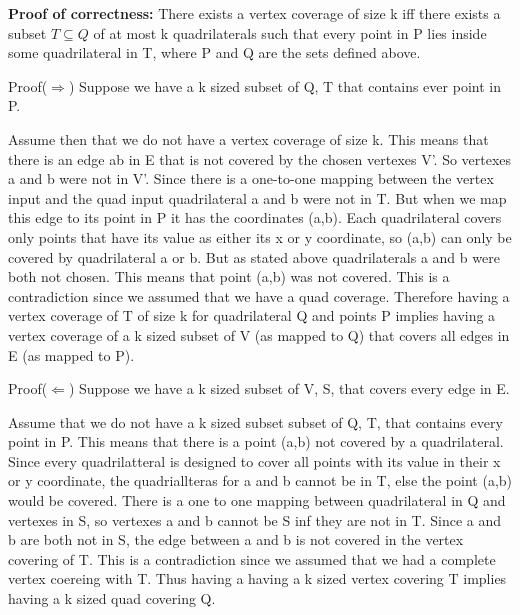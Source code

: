 \documentclass[12pt]{article}
\begin{document}
\textbf{Proof of correctness: } There exists a vertex coverage of size k iff there exists a subset $T \subseteq Q$ of at most k quadrilaterals such that every point in P lies inside some quadrilateral in T, where P and Q are the sets defined above.

Proof($\Rightarrow$)
Suppose we have a k sized subset of Q, T that contains ever point in P.

Assume then that we do not have a vertex coverage of size k. This means that there is an edge ab in E that is not covered by the chosen vertexes V'. So vertexes a and b were not in V'. Since there is a one-to-one mapping between the vertex input and the quad input quadrilateral a and b were not in T. But when we map this edge to its point in P it has the coordinates (a,b). Each quadrilateral covers only points that have its value as either its x or y coordinate, so (a,b) can only be covered by quadrilateral a or b. But as stated above quadrilaterals a and b were both not chosen. This means that point (a,b) was not covered. This is a contradiction since we assumed that we have a quad coverage. Therefore having a vertex coverage of T of size k for quadrilateral Q and points P implies having a vertex coverage of a k sized subset of V (as mapped to Q) that covers all edges in E (as mapped to P).

Proof($\Leftarrow$)
Suppose we have a k sized subset of V, S, that covers every edge in E.

Assume that we do not have a k sized subset subset of Q, T, that contains every point in P. This means that there is a point (a,b) not covered by a quadrilateral. Since every quadrilatteral is designed to cover all points with its value in their x or y coordinate, the quadriallteras for a and b cannot be in T, else the point (a,b) would be covered. There is a one to one mapping between quadrilateral in Q and vertexes in S, so vertexes a and b cannot be S inf they are not in T. Since a and b are both not in S, the edge between a and b is not covered in the vertex covering of T. This is a contradiction since we assumed that we had a complete vertex coereing with T. Thus having a having a k sized vertex covering T implies having a k sized quad covering Q.
\end{document}
